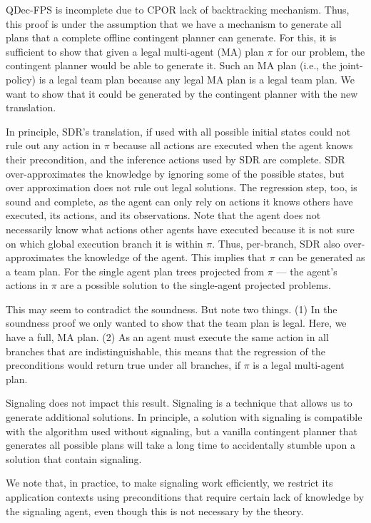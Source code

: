 \documentclass[letterpaper]{article} %
\theoremstyle{definition}
\begin{document}
{ 
QDec-FPS is incomplete due to CPOR lack of backtracking mechanism. Thus, this proof is under the assumption that we have a mechanism to generate all
plans that a complete offline contingent planner can generate. For this, it is sufficient to show that given a legal multi-agent (MA) plan $\pi$ for our problem, the contingent planner would be able to generate it. Such an MA plan (i.e., the joint-policy) is a legal team plan because any legal MA plan is a legal team plan. We want to show that it could be generated by the contingent planner with the new translation. 

In principle, SDR's translation, if used with all possible initial states could not rule out any action in $\pi$ because all actions are executed when the agent knows their precondition, and the inference actions used by SDR are complete. 
SDR over-approximates the knowledge by ignoring some of the possible states, but over approximation does not rule out legal solutions. The regression step, too, is sound and complete, as the agent can only rely on actions it knows others have executed, its actions, and its observations. 
Note that the agent does not necessarily know what actions other agents have executed because it is not sure on which global execution branch it is within $\pi$. Thus, per-branch, SDR also over-approximates the knowledge of the agent. 
This implies that $\pi$ can be generated as a team plan. 
For the single agent plan trees projected from $\pi$ --- the agent's actions in $\pi$ are a possible solution to the single-agent projected problems.%

This may seem to contradict the soundness. But note two things. (1) In the soundness proof we only wanted to show that the team plan is legal.
Here, we have a full, MA plan. (2) As an agent must execute the same action
in all branches that are indistinguishable, this means that the regression of
the preconditions would return true under all branches, if $\pi$ is a legal multi-agent plan.

Signaling does not impact this result. Signaling is a technique that allows us to generate additional solutions. In principle, a solution with signaling is compatible with the algorithm used without signaling, but a vanilla contingent planner that generates all possible plans will take a long time to accidentally stumble upon a solution that contain signaling. 

We note that, in practice, to make signaling work efficiently, we restrict its application contexts using preconditions that require certain lack of knowledge by the signaling agent, even though this is
not necessary by the theory.
}
\end{document}
